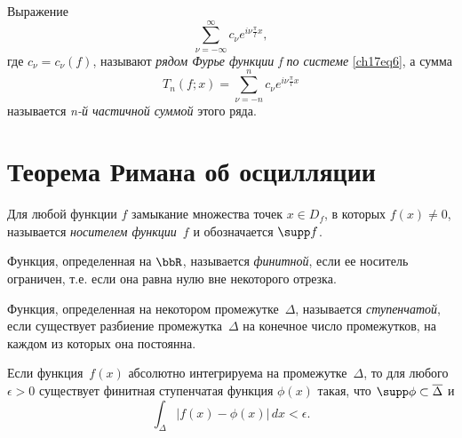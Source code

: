 \begin{defn}
Выражение
$$
\sum_{\nu = -\infty}^{\infty} c_{\nu}e^{i\nu\frac{\pi}{l}x},
$$
где $c_{\nu} = c_{\nu}(f)$, называют \textit{рядом Фурье функции f по системе} \eqref{ch17eq6}, а сумма
$$
T_{n}(f;x) = \sum_{\nu = -n}^{n} c_{\nu}e^{i\nu\frac{\pi}{l}x}
$$
называется \textit{n-й частичной суммой} этого ряда.
\end{defn}

\section{Теорема Римана об осцилляции}
\begin{defn}
Для любой функции $f$ замыкание множества точек $x \in D_{f}$, в которых $f(x) \neq 0$, называется \textit{носителем функции~$f$} и обозначается $\supp f$.
\end{defn}
\begin{defn}
Функция, определенная на $\bbR$, называется \textit{финитной}, если ее носитель ограничен, т.е. если она равна нулю вне некоторого отрезка.
\end{defn}
\begin{defn}
Функция, определенная на некотором промежутке~$\Delta$, называется \textit{ступенчатой}, если существует разбиение промежутка~$\Delta$ на конечное число промежутков, на каждом из которых она постоянна.
\end{defn}
\begin{thm} \label{ch17thm1}
Если функция~$f(x)$ абсолютно интегрируема на промежутке~$\Delta$, то для любого $\epsilon > 0$ существует финитная ступенчатая функция $\phi(x)$ такая, что $\supp\phi \subset \overline{\Delta}$ и
\begin{equation} \label{ch17eq7}
\int_{\Delta} |f(x) - \phi(x)|\,dx < \epsilon.
\end{equation}
\end{thm}

